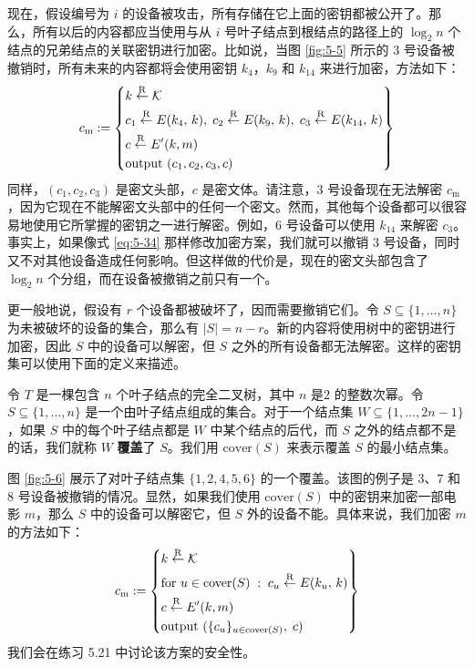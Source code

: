 \begin{snote}[撤销设备。]
现在，假设编号为 $i$ 的设备被攻击，所有存储在它上面的密钥都被公开了。那么，所有以后的内容都应当使用与从 $i$ 号叶子结点到根结点的路径上的 $\log_2n$ 个结点的兄弟结点的关联密钥进行加密。比如说，当图 \ref{fig:5-5} 所示的 $3$ 号设备被撤销时，所有未来的内容都将会使用密钥 $k_4$，$k_9$ 和 $k_{14}$ 来进行加密，方法如下：
\begin{equation}\label{eq:5-34}
c_\mathrm{m}:=
\left\{
\begin{aligned}
& k\overset{\rm R}\leftarrow\mathcal{K}\\
& c_1\overset{\rm R}\leftarrow E(k_4,\,k),\;
c_2\overset{\rm R}\leftarrow E(k_9,\,k),\;
c_3\overset{\rm R}\leftarrow E(k_{14},\,k)\\
& c\overset{\rm R}\leftarrow E'(k,m)\\
& \text{output } (c_1,c_2,c_3,c)
\end{aligned}
\right\}
\end{equation}
同样，$(c_1,c_2,c_3)$ 是密文头部，$c$ 是密文体。请注意，$3$ 号设备现在无法解密 $c_\mathrm{m}$，因为它现在不能解密文头部中的任何一个密文。然而，其他每个设备都可以很容易地使用它所掌握的密钥之一进行解密。例如，$6$ 号设备可以使用 $k_{14}$ 来解密 $c_3$。事实上，如果像式 \ref{eq:5-34} 那样修改加密方案，我们就可以撤销 $3$ 号设备，同时又不对其他设备造成任何影响。但这样做的代价是，现在的密文头部包含了 $\log_2n$ 个分组，而在设备被撤销之前只有一个。

更一般地说，假设有 $r$ 个设备都被破坏了，因而需要撤销它们。令 $S\subseteq\{1,\dots,n\}$ 为未被破坏的设备的集合，那么有 $|S|=n-r$。新的内容将使用树中的密钥进行加密，因此 $S$ 中的设备可以解密，但 $S$ 之外的所有设备都无法解密。这样的密钥集可以使用下面的定义来描述。
\end{snote}

\begin{definition}\label{def:5-4}
令 $T$ 是一棵包含 $n$ 个叶子结点的完全二叉树，其中 $n$ 是$2$ 的整数次幂。令 $S\subseteq\{1,\dots,n\}$ 是一个由叶子结点组成的集合。对于一个结点集 $W\subseteq\{1,\dots,2n-1\}$，如果 $S$ 中的每个叶子结点都是 $W$ 中某个结点的后代，而 $S$ 之外的结点都不是的话，我们就称 $W$ \textbf{覆盖}了 $S$。我们用 $\mathrm{cover}(S)$ 来表示覆盖 $S$ 的最小结点集。
\end{definition}

图 \ref{fig:5-6} 展示了对叶子结点集 $\{1,2,4,5,6\}$ 的一个覆盖。该图的例子是 $3$、$7$ 和 $8$ 号设备被撤销的情况。显然，如果我们使用 $\mathrm{cover}(S)$ 中的密钥来加密一部电影 $m$，那么 $S$ 中的设备可以解密它，但 $S$ 外的设备不能。具体来说，我们加密 $m$ 的方法如下：
\begin{equation}\label{eq:5-35}
c_\mathrm{m}:=
\left\{
\begin{aligned}
& k\overset{\rm R}\leftarrow\mathcal{K}\\
& \text{for } u\in\mathrm{cover}(S)\;:\; c_u\overset{\rm R}\leftarrow E(k_u,\,k)\\
& c\overset{\rm R}\leftarrow E'(k,m)\\
& \text{output } (\{c_u\}_{u\in\mathrm{cover}(S)},\;c)
\end{aligned}
\right\}
\end{equation}
我们会在练习 5.21 中讨论该方案的安全性。

